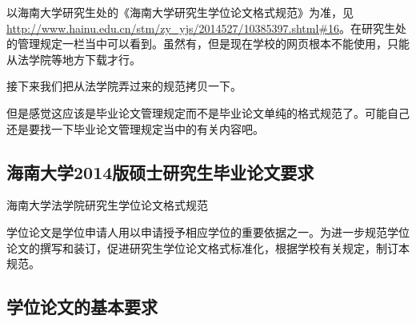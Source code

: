 \documentclass{hnuthesis}%
\begin{document}
以海南大学研究生处的《海南大学研究生学位论文格式规范》为准，见\url{http://www.hainu.edu.cn/stm/zy_yjs/2014527/10385397.shtml#16}。在研究生处的管理规定一栏当中可以看到。虽然有，但是现在学校的网页根本不能使用，只能从法学院等地方下载才行。

接下来我们把从法学院弄过来的规范拷贝一下。

但是感觉这应该是毕业论文管理规定而不是毕业论文单纯的格式规范了。可能自己还是要找一下毕业论文管理规定当中的有关内容吧。


\subsection{海南大学2014版硕士研究生毕业论文要求}

海南大学法学院研究生学位论文格式规范


学位论文是学位申请人用以申请授予相应学位的重要依据之一。为进一步规范学位论文的撰写和装订，促进研究生学位论文格式标准化，根据学校有关规定，制订本规范。

\subsection{学位论文的基本要求}
\end{document}
